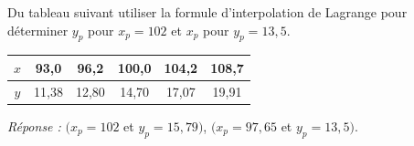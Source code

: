 \begin{exercice}[Exercice 3]
Du tableau suivant utiliser la formule d'interpolation de Lagrange pour
déterminer $y_p$ pour $x_p = 102$ et $x_p$ pour $y_p = 13{,}5$.
\begin{center}
  \begin{tabular}{|c|c|c|c|c|c|}
    \hline
    $x$ & 93,0 & 96,2 & 100,0 & 104,2 & 108,7\\ \hline
    $y$ & 11,38 & 12,80 & 14,70 & 17,07 & 19,91\\ \hline
  \end{tabular}
\end{center}
\textit{Réponse :} $(x_p = 102$ et $y_p = 15{,}79)$, $(x_p = 97{,}65$ et
$y_p = 13{,}5)$.
\end{exercice}
